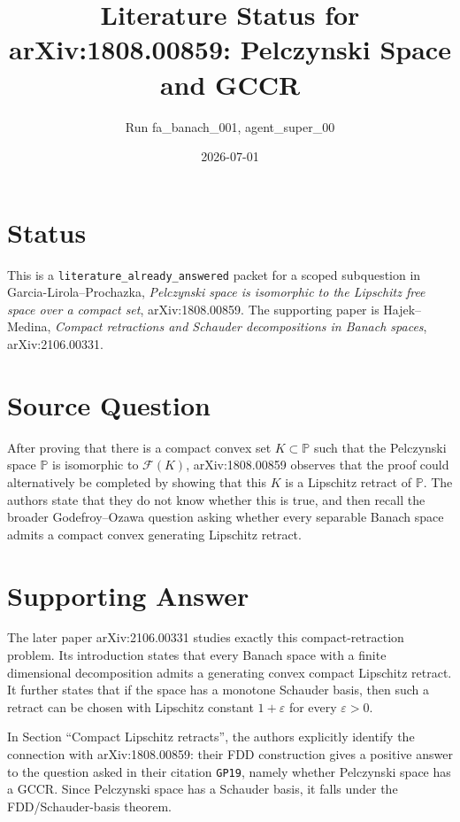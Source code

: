\documentclass[11pt]{article}
\title{Literature Status for arXiv:1808.00859: Pelczynski Space and GCCR}
\author{Run fa\_banach\_001, agent\_super\_00}
\date{2026-07-01}
\begin{document}
\maketitle

\section*{Status}

This is a \texttt{literature\_already\_answered} packet for a scoped
subquestion in Garcia-Lirola--Prochazka,
\emph{Pelczynski space is isomorphic to the Lipschitz free space over a
compact set}, arXiv:1808.00859.  The supporting paper is Hajek--Medina,
\emph{Compact retractions and Schauder decompositions in Banach spaces},
arXiv:2106.00331.

\section*{Source Question}

After proving that there is a compact convex set \(K\subset \mathbb P\) such
that the Pelczynski space \(\mathbb P\) is isomorphic to \(\mathcal F(K)\),
arXiv:1808.00859 observes that the proof could alternatively be completed by
showing that this \(K\) is a Lipschitz retract of \(\mathbb P\).  The authors
state that they do not know whether this is true, and then recall the broader
Godefroy--Ozawa question asking whether every separable Banach space admits a
compact convex generating Lipschitz retract.

\section*{Supporting Answer}

The later paper arXiv:2106.00331 studies exactly this compact-retraction
problem.  Its introduction states that every Banach space with a finite
dimensional decomposition admits a generating convex compact Lipschitz
retract.  It further states that if the space has a monotone Schauder basis,
then such a retract can be chosen with Lipschitz constant \(1+\varepsilon\)
for every \(\varepsilon>0\).

In Section ``Compact Lipschitz retracts'', the authors explicitly identify the
connection with arXiv:1808.00859: their FDD construction gives a positive
answer to the question asked in their citation \texttt{GP19}, namely whether
Pelczynski space has a GCCR.  Since Pelczynski space has a Schauder basis, it
falls under the FDD/Schauder-basis theorem.
\end{document}

